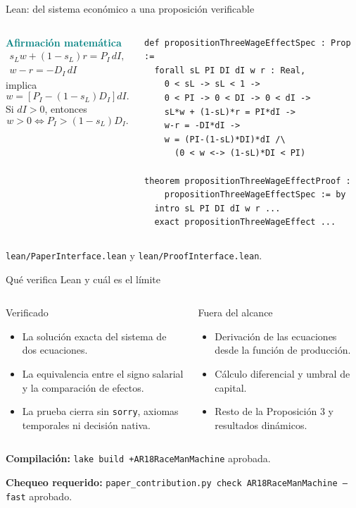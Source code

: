 \documentclass[aspectratio=169,11pt]{beamer}
\newcommand{\key}[1]{\textcolor{teal}{\textbf{#1}}}
\newcommand{\source}[1]{\vfill\hfill{\tiny\color{gray}#1}}
\begin{document}
\begin{frame}[fragile]{Lean: del sistema económico a una proposición verificable}
  \begin{columns}[T,onlytextwidth]
      \small
      \key{Afirmación matemática}
      \[
        \begin{gathered}
          s_Lw+(1-s_L)r=P_I\,dI,\\
          w-r=-D_I\,dI
        \end{gathered}
      \]
      implica
      \[
        w=[P_I-(1-s_L)D_I]dI.
      \]
      Si $dI>0$, entonces
      \[
        w>0\iff P_I>(1-s_L)D_I.
      \]
      \scriptsize
\begin{verbatim}
def propositionThreeWageEffectSpec : Prop :=
  forall sL PI DI dI w r : Real,
    0 < sL -> sL < 1 ->
    0 < PI -> 0 < DI -> 0 < dI ->
    sL*w + (1-sL)*r = PI*dI ->
    w-r = -DI*dI ->
    w = (PI-(1-sL)*DI)*dI /\
      (0 < w <-> (1-sL)*DI < PI)

theorem propositionThreeWageEffectProof :
    propositionThreeWageEffectSpec := by
  intro sL PI DI dI w r ...
  exact propositionThreeWageEffect ...
\end{verbatim}
  \end{columns}
  \source{\texttt{lean/PaperInterface.lean} y \texttt{lean/ProofInterface.lean}.}
\end{frame}

\begin{frame}{Qué verifica Lean y cuál es el límite}
  \begin{columns}[T,onlytextwidth]
      \begin{block}{Verificado}
        \begin{itemize}
          \item La solución exacta del sistema de dos ecuaciones.
          \item La equivalencia entre el signo salarial y la comparación de efectos.
          \item La prueba cierra sin \texttt{sorry}, axiomas temporales ni decisión nativa.
        \end{itemize}
      \end{block}
      \begin{block}{Fuera del alcance}
        \begin{itemize}
          \item Derivación de las ecuaciones desde la función de producción.
          \item Cálculo diferencial y umbral de capital.
          \item Resto de la Proposición 3 y resultados dinámicos.
        \end{itemize}
      \end{block}
  \end{columns}
  \vspace{0.35cm}
  \centering
  \textbf{Compilación:} \texttt{lake build +AR18RaceManMachine} aprobada.

  \textbf{Chequeo requerido:} \texttt{paper\_contribution.py check AR18RaceManMachine --fast} aprobado.
\end{frame}
\end{document}
